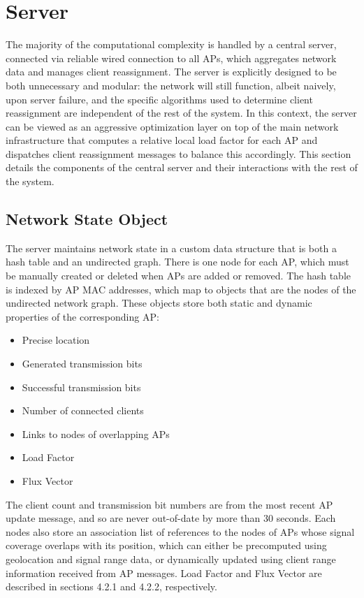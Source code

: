 \documentclass[10pt,journal,compsoc]{IEEEtran}
\begin{document}
		\section{Server}
		The majority of the computational complexity is handled by a central server, connected via reliable wired connection to all APs, which aggregates network data and manages client reassignment. The server is explicitly designed to be both unnecessary and modular: the network will still function, albeit naively, upon server failure, and the specific algorithms used to determine client reassignment are independent of the rest of the system. In this context, the server can be viewed as an aggressive optimization layer on top of the main network infrastructure that computes a relative local load factor for each AP and dispatches client reassignment messages to balance this accordingly. This section details the components of the central server and their interactions with the rest of the system.
		
		\subsection{Network State Object}
		The server maintains network state in a custom data structure that is both a hash table and an undirected graph. There is one node for each AP, which must be manually created or deleted when APs are added or removed. The hash table is indexed by AP MAC addresses, which map to objects that are the nodes of the undirected network graph. These objects store both static and dynamic properties of the corresponding AP:
		\begin{itemize}
			\item Precise location
			\item Generated transmission bits
			\item Successful transmission bits
			\item Number of connected clients
			\item Links to nodes of overlapping APs
			\item Load Factor
			\item Flux Vector
		\end{itemize}
		The client count and transmission bit numbers are from the most recent AP update message, and so are never out-of-date by more than 30 seconds. Each nodes also store an association list of references to the nodes of APs whose signal coverage overlaps with its position, which can either be precomputed using geolocation and signal range data, or dynamically updated using client range information received from AP messages. Load Factor and Flux Vector are described in sections 4.2.1 and 4.2.2, respectively.
		
\end{document}
